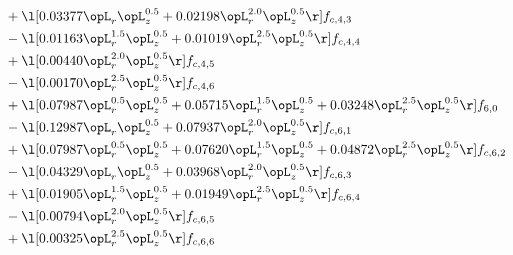 \begin{alignat}{2}
& + \l[  0.03377 \opL_r \opL_z^{0.5} +  0.02198 \opL_r^{2.0} \opL_z^{0.5}  \r] f_{c,4,3} \nonumber \\ 
& - \l[  0.01163 \opL_r^{1.5} \opL_z^{0.5} +  0.01019 \opL_r^{2.5} \opL_z^{0.5}  \r] f_{c,4,4} \nonumber \\ 
& + \l[  0.00440 \opL_r^{2.0} \opL_z^{0.5}  \r] f_{c,4,5} \nonumber \\ 
& - \l[  0.00170 \opL_r^{2.5} \opL_z^{0.5}  \r] f_{c,4,6} \nonumber \\ 
& + \l[  0.07987 \opL_r^{0.5} \opL_z^{0.5} +  0.05715 \opL_r^{1.5} \opL_z^{0.5} +  0.03248 \opL_r^{2.5} \opL_z^{0.5}  \r] f_{6,0} \nonumber \\ 
& - \l[  0.12987 \opL_r \opL_z^{0.5} +  0.07937 \opL_r^{2.0} \opL_z^{0.5}  \r] f_{c,6,1} \nonumber \\ 
& + \l[  0.07987 \opL_r^{0.5} \opL_z^{0.5} +  0.07620 \opL_r^{1.5} \opL_z^{0.5} +  0.04872 \opL_r^{2.5} \opL_z^{0.5}  \r] f_{c,6,2} \nonumber \\ 
& - \l[  0.04329 \opL_r \opL_z^{0.5} +  0.03968 \opL_r^{2.0} \opL_z^{0.5}  \r] f_{c,6,3} \nonumber \\ 
& + \l[  0.01905 \opL_r^{1.5} \opL_z^{0.5} +  0.01949 \opL_r^{2.5} \opL_z^{0.5}  \r] f_{c,6,4} \nonumber \\ 
& - \l[  0.00794 \opL_r^{2.0} \opL_z^{0.5}  \r] f_{c,6,5} \nonumber \\ 
& + \l[  0.00325 \opL_r^{2.5} \opL_z^{0.5}  \r] f_{c,6,6} \nonumber \\ 
\end{alignat} 


